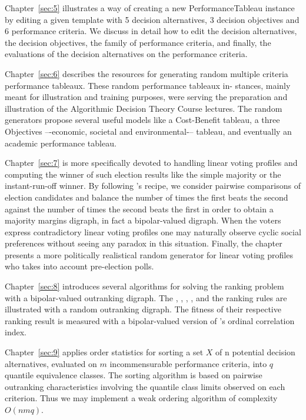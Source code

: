 Chapter~\vref{sec:5} illustrates a way of creating a new PerformanceTableau instance by editing a given template with 5 decision alternatives, 3 decision objectives and 6 performance criteria. We discuss in detail how to edit the decision alternatives, the decision objectives, the family of performance criteria, and finally, the evaluations of the decision alternatives on the performance criteria.

Chapter~\vref{sec:6} describes the \Digraph resources for generating random multiple criteria performance tableaux. These random performance tableaux in- stances, mainly meant for illustration and training purposes, were serving the preparation and illustration of the Algorithmic Decision Theory Course lectures. The random generators propose several useful models like a Cost-Benefit tableau, a three Objectives –-economic, societal and environmental-– tableau, and eventually an academic performance tableau.

Chapter~\vref{sec:7} is more specifically devoted to handling linear voting profiles and computing the winner of such election results like the simple majority or the instant-run-off winner. By following \Condorcet 's recipe, we consider pairwise comparisons of election candidates and balance the number of times the first beats the second against the number of times the second beats the first in order to obtain a majority margins digraph, in fact a bipolar-valued digraph. When the voters express contradictory linear voting profiles one may naturally observe cyclic social preferences without seeing any paradox in this situation. Finally, the chapter presents a more politically realistical random generator for linear voting profiles who takes into account pre-election polls.

Chapter~\vref{sec:8} introduces several algorithms for solving the ranking problem with a bipolar-valued outranking digraph. The \Copeland, \NetFlows, \Kemeny, \Slater, \Kohler and the \RankedPairs ranking rules are illustrated with a random outranking digraph. The fitness of their respective ranking result is measured with a bipolar-valued version of \Kendall 's ordinal correlation index.

Chapter~\vref{sec:9} applies order statistics for sorting a set $X$ of n potential decision alternatives, evaluated on $m$ incommensurable performance criteria, into $q$ quantile equivalence classes. The sorting algorithm is based on pairwise outranking characteristics involving the quantile class limits observed on each criterion. Thus we may implement a weak ordering algorithm of complexity $O(nmq)$.

